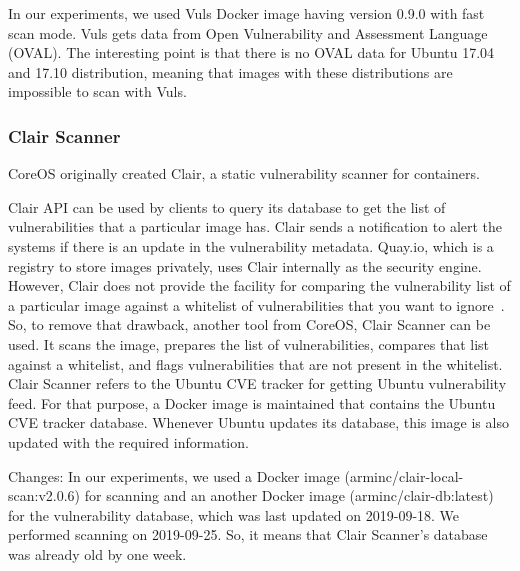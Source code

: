 \documentclass[a4paper,num-refs]{oup-contemporary}
\newcommand{\change}[2]{\color{cyan}Changes: #1\color{black}}
\begin{document}
In our experiments, we used Vuls Docker image having version 0.9.0 with fast scan mode.
Vuls gets data from Open Vulnerability and Assessment Language (OVAL).
The interesting point is that there is no OVAL data for Ubuntu 17.04 and 17.10 distribution,
meaning that images with these distributions are impossible to scan with Vuls.

\subsubsection{Clair Scanner}

CoreOS originally created Clair, a static vulnerability scanner for containers. 

Clair API can be used by clients to query its database to get
the list of vulnerabilities that a particular image has. Clair sends a notification
to alert the systems if there is an update in the vulnerability metadata. Quay.io, which
is a registry to store images privately, uses Clair internally as the security engine. However, Clair does not 
provide the facility for comparing
the vulnerability list of a particular image against a whitelist of vulnerabilities that you
want to ignore~\cite{arminc_2019}. 
So, to remove
that drawback, another tool from CoreOS, Clair Scanner can be used. It scans the image, prepares the list of
vulnerabilities, compares that list against a whitelist, and flags vulnerabilities
that are not present in the whitelist.
Clair Scanner refers to the Ubuntu CVE tracker for getting Ubuntu vulnerability feed.
For that purpose, a Docker image is maintained that contains the Ubuntu CVE tracker database.
Whenever Ubuntu updates its database, this image is also updated with the required information.

\change{In our experiments, we used a Docker image (arminc/clair-local-scan:v2.0.6) for scanning
and an another Docker image (arminc/clair-db:latest) for the vulnerability database, which was
last updated on 2019-09-18. We performed
scanning on 2019-09-25. So, it means that Clair Scanner's database was already
old by one week.}

\subsubsection{Stools}
\end{document}
